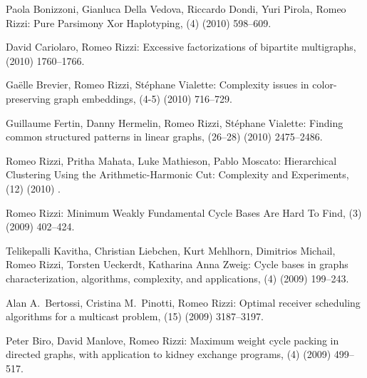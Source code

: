 \begin{etaremune}
  \item {\sc Paola Bonizzoni, Gianluca Della Vedova, Riccardo Dondi, Yuri Pirola, Romeo Rizzi:}
   \newblock  Pure Parsimony Xor Haplotyping,
   (4) (2010) 598--609.

  \item {\sc David Cariolaro, Romeo Rizzi:}
   \newblock  Excessive factorizations of bipartite multigraphs,
    (2010) 1760--1766.

  \item {\sc Ga\"elle Brevier, Romeo Rizzi, St\'ephane Vialette:}
   \newblock   Complexity issues in color-preserving graph embeddings,
   (4-5) (2010) 716--729.

  \item {\sc Guillaume Fertin, Danny Hermelin, Romeo Rizzi, St\'ephane Vialette:}
   \newblock  Finding common structured patterns in linear graphs,
   (26--28) (2010) 2475--2486.

  \item {\sc Romeo Rizzi, Pritha Mahata, Luke Mathieson, Pablo Moscato:}
   \newblock  Hierarchical Clustering Using the Arithmetic-Harmonic Cut: Complexity and Experiments,
   (12) (2010) .

  \item {\sc Romeo Rizzi:}
   \newblock   Minimum Weakly Fundamental Cycle Bases Are Hard To Find,
   (3) (2009) 402--424.

  \item {\sc Telikepalli Kavitha, Christian Liebchen, Kurt Mehlhorn, Dimitrios Michail, Romeo Rizzi, Torsten Ueckerdt, Katharina Anna Zweig:}
   \newblock  Cycle bases in graphs characterization, algorithms, complexity, and applications,
   (4) (2009) 199--243.

  \item {\sc Alan A.~Bertossi, Cristina M.~Pinotti, Romeo Rizzi:}
   \newblock  Optimal receiver scheduling algorithms for a multicast problem,
   (15) (2009) 3187--3197.

  \item {\sc Peter Biro, David Manlove, Romeo Rizzi:}
   \newblock   Maximum weight cycle packing in directed graphs, with application to kidney exchange programs,
   (4) (2009) 499--517.


\end{etaremune}
